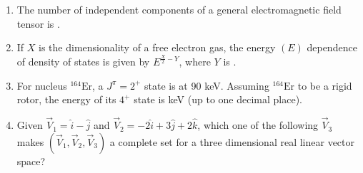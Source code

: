 \documentclass[journal]{IEEEtran}
\numberwithin{equation}{enumi}
\numberwithin{figure}{enumi}
\begin{document}
\begin{enumerate}
\item The number of independent components of a general electromagnetic field tensor is \underline{\hspace{2cm}}.
    \bigskip

\item If $X$ is the dimensionality of a free electron gas, the energy $(E)$ dependence of density of states is given by $E^{\frac{X}{2}-Y}$, where $Y$ is \underline{\hspace{2cm}}.
    \bigskip

\item For nucleus $^{164}\text{Er}$, a $J^{\pi} = 2^+$ state is at 90 keV. Assuming $^{164}\text{Er}$ to be a rigid rotor, the energy of its $4^+$ state is \underline{\hspace{2cm}} keV (up to one decimal place).

\bigskip

\item Given $\vec{V}_1 = \hat{i} - \hat{j}$ and $\vec{V}_2 = -2\hat{i} + 3\hat{j} + 2\hat{k}$, which one of the following $\vec{V}_3$ makes $(\vec{V}_1, \vec{V}_2, \vec{V}_3)$ a complete set for a three dimensional real linear vector space?
\begin{enumerate}
\end{enumerate}
\end{enumerate}
\end{document}
